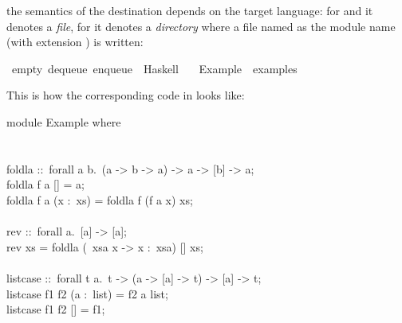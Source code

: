 \begin{isabellebody}
\begin{isamarkuptext}
  the semantics of the destination depends on the target language:  for
   and  it denotes a \emph{file}, for 
  it denotes a \emph{directory} where a file named as the module name
  (with extension ) is written:%
\end{isamarkuptext}%
\isamarkuptrue%
%
\isadelimquote
%
\endisadelimquote
%
\isatagquote
{}\isamarkupfalse%
\ empty\ dequeue\ enqueue\ \ Haskell\isanewline
\ \ \ Example\ \ {\isachardoublequoteopen}examples{\isacharslash}{\isachardoublequoteclose}%
\endisatagquote
{\isafoldquote}%
%
\isadelimquote
%
\endisadelimquote
%
\begin{isamarkuptext}%
\noindent This is how the corresponding code in  looks like:%
\end{isamarkuptext}%
\isamarkuptrue%
%
\isadelimquote
%
\endisadelimquote
%
\isatagquote
%
\begin{isamarkuptext}%
\isatypewriter%
\noindent%
\hspace*{0pt}module Example where {}\\
\hspace*{0pt}\\
\hspace*{0pt}\\
\hspace*{0pt}foldla ::~forall a b.~(a -> b -> a) -> a -> [b] -> a;\\
\hspace*{0pt}foldla f a [] = a;\\
\hspace*{0pt}foldla f a (x :~xs) = foldla f (f a x) xs;\\
\hspace*{0pt}\\
\hspace*{0pt}rev ::~forall a.~[a] -> [a];\\
\hspace*{0pt}rev xs = foldla ({}~xsa x -> x :~xsa) [] xs;\\
\hspace*{0pt}\\
\hspace*{0pt}list{}case ::~forall t a.~t -> (a -> [a] -> t) -> [a] -> t;\\
\hspace*{0pt}list{}case f1 f2 (a :~list) = f2 a list;\\
\hspace*{0pt}list{}case f1 f2 [] = f1;\\

\end{isamarkuptext}
\end{isabellebody}
